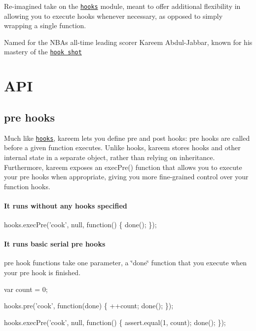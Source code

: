 \href{https://travis-ci.org/vkarpov15/kareem}{\tt } \href{https://coveralls.io/r/vkarpov15/kareem}{\tt }

Re-\/imagined take on the \href{http://npmjs.org/package/hooks}{\tt hooks} module, meant to offer additional flexibility in allowing you to execute hooks whenever necessary, as opposed to simply wrapping a single function.

Named for the N\+BA\textquotesingle{}s all-\/time leading scorer Kareem Abdul-\/\+Jabbar, known for his mastery of the \href{http://en.wikipedia.org/wiki/Kareem_Abdul-Jabbar#Skyhook}{\tt hook shot}



\section*{A\+PI}

\subsection*{pre hooks}

Much like \href{https://npmjs.org/package/hooks}{\tt hooks}, kareem lets you define pre and post hooks\+: pre hooks are called before a given function executes. Unlike hooks, kareem stores hooks and other internal state in a separate object, rather than relying on inheritance. Furthermore, kareem exposes an {\ttfamily exec\+Pre()} function that allows you to execute your pre hooks when appropriate, giving you more fine-\/grained control over your function hooks.

\paragraph*{It runs without any hooks specified}


\begin{DoxyCode}
hooks.execPre('cook', null, function() \{
  done();
\});
\end{DoxyCode}


\paragraph*{It runs basic serial pre hooks}

pre hook functions take one parameter, a \char`\"{}done\char`\"{} function that you execute when your pre hook is finished.


\begin{DoxyCode}
var count = 0;

hooks.pre('cook', function(done) \{
  ++count;
  done();
\});

hooks.execPre('cook', null, function() \{
  assert.equal(1, count);
  done();
\});
\end{DoxyCode}


